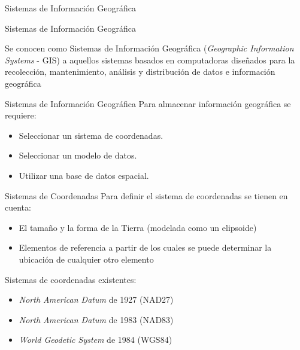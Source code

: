 \begin{frame}[c]
	\begin{center}
		\huge{Sistemas de Información Geográfica}
    \end{center}
\end{frame}

\begin{frame}[c]{Sistemas de Información Geográfica}
	\begin{center}
	 Se conocen como Sistemas de Información Geográfica (\emph{Geographic Information Systems} - GIS) a aquellos sistemas basados en computadoras diseñados para la recolección, mantenimiento, análisis y distribución de datos e información geográfica 	
	\end{center}
\end{frame}

\begin{frame}[c]{Sistemas de Información Geográfica}
	\large{Para almacenar información geográfica se requiere:}
	\vspace{\baselineskip}
	\begin{center}
		\begin{itemize}	 	
			\item Seleccionar un sistema de coordenadas.
			\item Seleccionar un modelo de datos.
			\item Utilizar una base de datos espacial.
		\end{itemize}			
	\end{center}
\end{frame}

\begin{frame}[c]{Sistemas de Coordenadas}
	Para	definir el sistema de coordenadas se tienen en cuenta:
	\vspace{\baselineskip}
	\begin{itemize}	 	
		\item El tamaño y la forma de la Tierra (modelada como un elipsoide)	
		\item Elementos de
		referencia a partir de los cuales se puede determinar la ubicación de cualquier otro elemento
	\end{itemize}			
	\vspace{\baselineskip}	
	Sistemas de coordenadas existentes:
	\vspace{\baselineskip}
	\begin{itemize}	 	
		\item \emph{North American
		Datum} de 1927 (NAD27)
		\item \emph{North American Datum} de 1983
		(NAD83)
		\item \emph{World Geodetic System} de 1984 (WGS84)
	\end{itemize}			
\end{frame}

